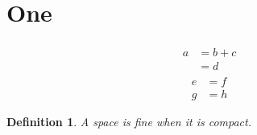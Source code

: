 \documentclass{amsart}
\numberwithin{equation}{section}
\newtheorem{definition}[equation]{Definition}
\begin{document}
\section{One}
\begin{align}
\begin{split}
a &= b + c \\
  &= d
\end{split}
\end{align}
\begin{align}
e &= f \\
g &= h
\end{align}
\begin{definition} A space is fine when it is compact. \end{definition}
\end{document}
